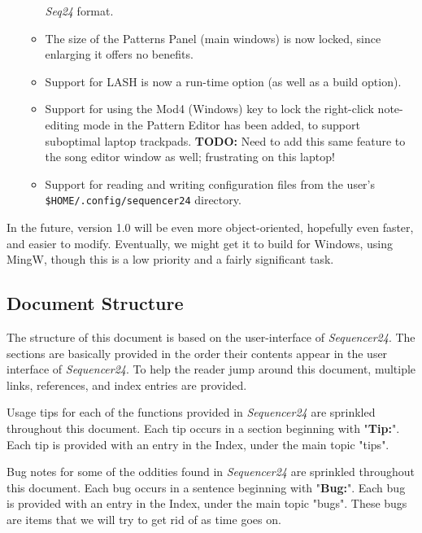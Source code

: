 \documentclass[
 11pt,
 twoside,
 a4paper,
 headinclude,
 footinclude,
 final                                 %
]{article}
\begin{document}
\begin{itemize}
\begin{itemize}
            \textsl{Seq24} format.
         \item The size of the Patterns Panel (main windows) is now locked,
            since enlarging it offers no benefits.
         \item Support for LASH is now a run-time option (as well as a build
            option).
         \item Support for using the Mod4 (Windows) key to lock the
            right-click note-editing mode in the Pattern Editor has been
            added, to support suboptimal laptop trackpads.
            \textbf{TODO:}
            Need to add this same feature to the song editor window as well;
            frustrating on this laptop!
         \item Support for reading and writing configuration files from the
            user's \texttt{\$HOME/.config/sequencer24} directory.
      \end{itemize}
   \end{itemize}

   In the future, version 1.0 will be even more object-oriented, hopefully
   even faster, and easier to modify.  Eventually, we might get it to build
   for Windows, using MingW, though this is a low priority and a fairly
   significant task.

\subsection{Document Structure}
\label{subsec:introduction_document_structure}

   The structure of this document is based on the user-interface of
   \textsl{Sequencer24}.  The sections are basically provided in the order
   their contents appear in the user interface of \textsl{Sequencer24}.  To
   help the reader jump around this document, multiple links, references,
   and index entries are provided.

   Usage tips
   for each of the functions provided in
   \textsl{Sequencer24} are sprinkled throughout this document.
   Each tip occurs in a section beginning with "\textbf{Tip:}".
   Each tip is provided with an entry in the Index, under the
   main topic "tips".

   Bug notes
   for some of the oddities found in \textsl{Sequencer24} are
   sprinkled throughout this document.
   Each bug occurs in a sentence beginning with "\textbf{Bug:}".
   Each bug is provided with an entry in the Index, under the
   main topic "bugs".  These bugs are items that we will try to
   get rid of as time goes on.
\end{document}
